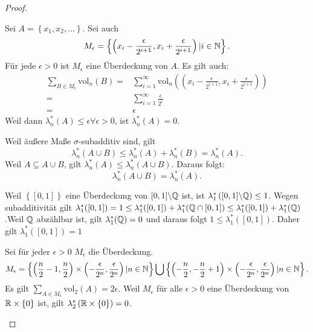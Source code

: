 \begin{proof}
	\begin{parts}
	\item	Sei $A=\left\{ x_1,x_2,\dots \right\} $. Sei auch
		\[
			M_\epsilon=\left\{\left( x_i-\frac{\epsilon}{2^{i+1}},x_i+\frac{\epsilon}{2^{i+1}}\right)|i\in\mathbb{N}  \right\} 
		.\] 
		F\"{u}r jede $\epsilon>0$ ist $M_\epsilon$ eine \"{U}berdeckung von $A$. Es gilt auch:
		\begin{align*}
			\sum_{B \in M_\epsilon} \text{vol}_n(B)=& \sum_{i=1}^\infty \text{vol}_n\left( \left( x_i-\frac{\epsilon}{2^{i+1}},x_i+\frac{\epsilon}{2^{i+1}} \right)  \right) \\
			=&\sum_{i=1}^{\infty} \frac{\epsilon}{2^i}\\
			=&\epsilon
		\end{align*}
		Weil dann $\lambda_n^*(A)\le \epsilon\forall \epsilon>0$, ist $\lambda_n^*(A)=0$.
	\item Weil äußere Maße $\sigma$-subadditiv sind, gilt
		\[
			\lambda_n^*(A\cup B)\le \lambda_n^*(A)+\lambda_n^*(B)=\lambda_n^*(A)
		.\] 
		Weil $A\subseteq A\cup B$, gilt $\lambda_n^*(A)\le \lambda_n^*(A\cup B)$. Daraus folgt:
		\[
		\lambda_n^*(A\cup B)=\lambda_n^*(A)
		.\] 
	\item Weil $\left\{ [0,1] \right\} $ eine \"{U}berdeckung von $[0,1]\backslash \mathbb{Q}$ ist, ist $\lambda_1^*\left( [0,1]\backslash\mathbb{Q} \right) \le 1$. Wegen subadditivität gilt $\lambda_1^*([0,1])=1\le \lambda_1^*([0,1])+\lambda_1^*(\mathbb{Q}\cap [0,1])\le \lambda_1^*([0,1])+\lambda_1^*(\mathbb{Q})$.Weil $\mathbb{Q}$ abz\"{a}hlbar ist, gilt $\lambda_1^*(\mathbb{Q})=0$ und daraus folgt $1\le \lambda_1^*\left( [0,1] \right) $. Daher gilt $\lambda_1^*\left( [0,1] \right) =1$
	\item Sei f\"{u}r jeder $\epsilon>0$ $M_\epsilon$ die \"{U}berdeckung. 
		\[
		M_\epsilon=\left\{ \left( \frac{n}{2}-1,\frac{n}{2} \right) \times \left( -\frac{\epsilon}{2^n},\frac{\epsilon}{2^n} \right)|n\in \mathbb{N}  \right\} \bigcup \left\{ \left( -\frac{n}{2},-\frac{n}{2}+1 \right) \times \left( -\frac{\epsilon}{2^n},\frac{\epsilon}{2^n} \right)|n\in \mathbb{N}  \right\} 
		.\] 
		Es gilt $\sum_{A\in M_\epsilon} \text{vol}_2(A)=2\epsilon$. Weil $M_\epsilon$ f\"{u}r alle $\epsilon>0$ eine \"{U}berdeckung von $\mathbb{R}\times \left\{ 0 \right\} $ ist, gilt $\lambda_2^*\left( \mathbb{R}\times \left\{ 0 \right\}  \right) =0$.\qedhere
	\end{parts}
\end{proof}
